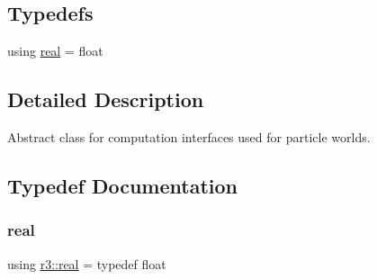 \subsection*{Typedefs}
\begin{DoxyCompactItemize}
\item 
using \mbox{\hyperlink{namespacer3_ab2016b3e3f743fb735afce242f0dc1eb}{real}} = float
\end{DoxyCompactItemize}


\subsection{Detailed Description}
Abstract class for computation interfaces used for particle worlds. 

\subsection{Typedef Documentation}
\mbox{\label{namespacer3_ab2016b3e3f743fb735afce242f0dc1eb}} 
\subsubsection{\texorpdfstring{real}{real}}
{\footnotesize\ttfamily using \mbox{\hyperlink{namespacer3_ab2016b3e3f743fb735afce242f0dc1eb}{r3\+::real}} = typedef float}

